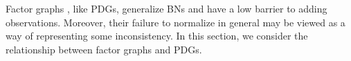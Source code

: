 \documentclass{article}
\theoremstyle{plain}
\theoremstyle{definition}
\theoremstyle{remark}
\numberwithin{equation}{section}
\begin{document}
\label{sec:factor-graphs}
	Factor graphs \cite{KF09}, like PDGs, generalize BNs and have a
        low barrier to adding observations.  Moreover, their failure to
        normalize in general may be viewed as a way of representing
        some
        inconsistency.
        In this section, we consider the relationship between factor graphs
and PDGs.        

\end{document}
